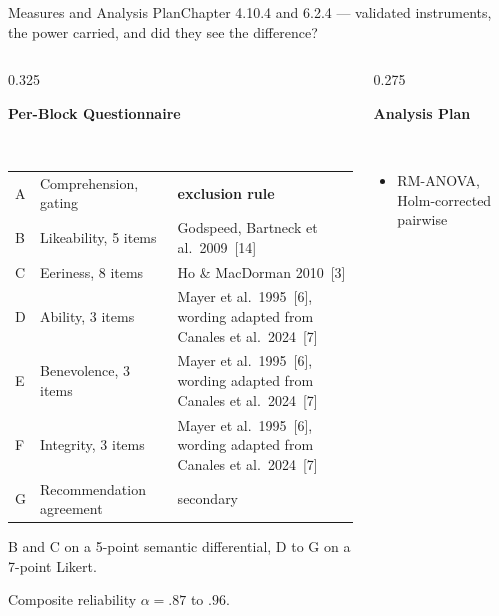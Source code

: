 \documentclass[aspectratio=169,10pt]{beamer}
\newcommand{\bad}[1]{{\color{knred}\textbf{#1}}}
\newcommand{\panelheadsm}[1]{\noindent\colorbox{kncyan}{\parbox{0.96\textwidth}{\centering\vspace{1pt}\color{white}\tiny\bfseries #1\vspace{1pt}}}\\[0.2em]}
\begin{document}
\begin{frame}{Measures and Analysis Plan}{Chapter 4.10.4 and 6.2.4 — validated instruments, the power carried, and did they see the difference?}
  \vspace{0.3em}
  \begin{columns}[T]
    \begin{column}{0.325\textwidth}
      \panelheadsm{Per-Block Questionnaire}
      \noindent\colorbox{knlight}{\parbox{0.96\textwidth}{\vspace{2pt}\tiny
      \setlength{\tabcolsep}{3pt}\renewcommand{\arraystretch}{1.28}
      \begin{tabular}{@{}>{\raggedright\arraybackslash}m{}>{\raggedright\arraybackslash}m{}>{\raggedright\arraybackslash}m{}@{}}
        A & Comprehension, gating & \bad{exclusion rule} \\
        B & Likeability, 5 items & Godspeed, Bartneck et al.\ 2009~[14] \\
        C & Eeriness, 8 items & Ho \& MacDorman 2010~[3] \\
        D & Ability, 3 items & Mayer et al.\ 1995~[6], wording adapted from Canales et al.\ 2024~[7] \\
        E & Benevolence, 3 items & Mayer et al.\ 1995~[6], wording adapted from Canales et al.\ 2024~[7] \\
        F & Integrity, 3 items & Mayer et al.\ 1995~[6], wording adapted from Canales et al.\ 2024~[7] \\
        G & Recommendation agreement & secondary \\
      \end{tabular}\vspace{2pt}}}
      \vspace{0.2em}
      {\tiny\color{kngrey}B and C on a 5-point semantic differential, D to G on a 7-point Likert.\par}
      \vspace{0.15em}
      {\tiny\color{kngrey}Composite reliability $\alpha=.87$ to $.96$.\par}
    \end{column}
    \begin{column}{0.275\textwidth}
      \panelheadsm{Analysis Plan}
      \noindent\colorbox{knlight}{\parbox{0.96\textwidth}{\vspace{2pt}\tiny
      \begin{itemize}\setlength{\itemsep}{0.18em}\setlength{\leftmargini}{1.0em}
        \item RM-ANOVA, Holm-corrected pairwise

\end{itemize}}}
\end{column}
\end{columns}
\end{frame}
\end{document}
